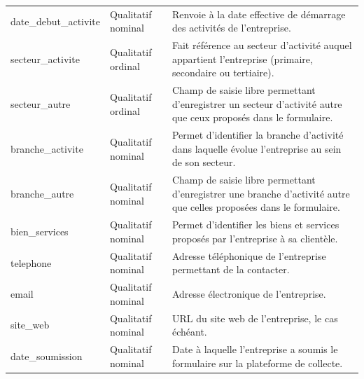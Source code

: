 \documentclass[12pt, a4paper, oneside]{report}
\begin{document}
\begin{table}[H]
\begin{tabularx}{\textwidth}{
				>{\ttfamily\raggedright\arraybackslash}p{3.8cm}
				>{\raggedright\arraybackslash}p{2.8cm}
				>{\raggedright\arraybackslash}X}
			\rowcolor{lightgray}
			date\_debut\_activite
			& Qualitatif nominal
			& Renvoie à la date effective de démarrage des activités
			de l'entreprise. \\
			
			secteur\_activite
			& Qualitatif ordinal
			& Fait référence au secteur d'activité auquel appartient
			l'entreprise (primaire, secondaire ou tertiaire). \\
			
			\rowcolor{lightgray}
			secteur\_autre
			& Qualitatif ordinal
			& Champ de saisie libre permettant d'enregistrer un secteur
			d'activité autre que ceux proposés dans le formulaire. \\
			
			branche\_activite
			& Qualitatif nominal
			& Permet d'identifier la branche d'activité dans laquelle
			évolue l'entreprise au sein de son secteur. \\
			
			\rowcolor{lightgray}
			branche\_autre
			& Qualitatif nominal
			& Champ de saisie libre permettant d'enregistrer une branche
			d'activité autre que celles proposées dans le formulaire. \\
			
			bien\_services
			& Qualitatif nominal
			& Permet d'identifier les biens et services proposés
			par l'entreprise à sa clientèle. \\
			
			\rowcolor{lightgray}
			telephone
			& Qualitatif nominal
			& Adresse téléphonique de l'entreprise permettant
			de la contacter. \\
			
			email
			& Qualitatif nominal
			& Adresse électronique de l'entreprise. \\
			
			\rowcolor{lightgray}
			site\_web
			& Qualitatif nominal
			& URL du site web de l'entreprise, le cas échéant. \\
			
			date\_soumission
			& Qualitatif nominal
			& Date à laquelle l'entreprise a soumis le formulaire
			sur la plateforme de collecte. \\
			
			\bottomrule
		\end{tabularx}
	\end{table}
	
\end{document}
